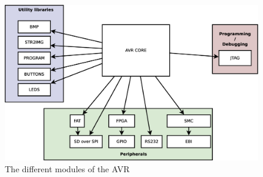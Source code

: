 \begin{figure}[h!]
\centering
\includegraphics[width=1.0\textwidth]{fig/avr/modules.eps}
\caption[AVR Modules]{The different modules of the AVR}
\label{fig:avr-modules}
\end{figure}

